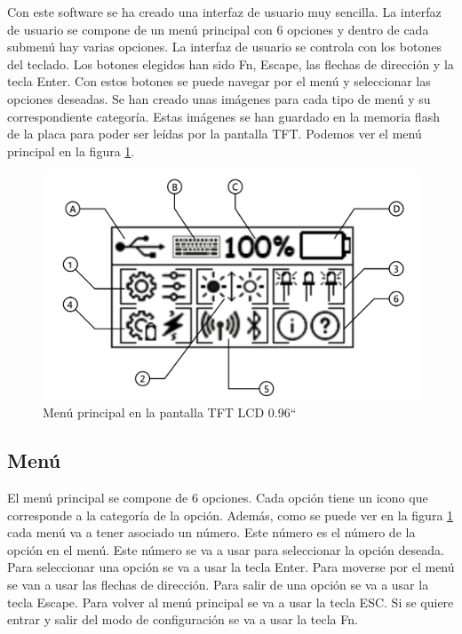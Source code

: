 Con este software se ha creado una interfaz de usuario muy sencilla. La interfaz de usuario se compone de un menú principal con 6 opciones y dentro de cada submenú hay varias opciones. La interfaz de usuario se controla con los botones del teclado. Los botones elegidos han sido Fn, Escape, las flechas de dirección y la tecla Enter. Con estos botones se puede navegar por el menú y seleccionar las opciones deseadas. Se han creado unas imágenes para cada tipo de menú y su correspondiente categoría. Estas imágenes se han guardado en la memoria flash de la placa para poder ser leídas por la pantalla \gls{TFT}. Podemos ver el menú principal en la figura \ref{fig:MenuPrincipal}.

\begin{figure}[H]
\centering
\includegraphics[width=1\textwidth]{imagenes/Capitulos/Cap07/PantallaMenuPrincipal.png}
\caption{Menú principal en la pantalla \gls{TFT} LCD 0.96``}
\label{fig:MenuPrincipal}
\end{figure}

\subsection{Menú}

El menú principal se compone de 6 opciones. Cada opción tiene un icono que corresponde a la categoría de la opción. Además, como se puede ver en la figura \ref{fig:MenuPrincipal} cada menú va a tener asociado un número. Este número es el número de la opción en el menú. Este número se va a usar para seleccionar la opción deseada. Para seleccionar una opción se va a usar la tecla Enter. Para moverse por el menú se van a usar las flechas de dirección. Para salir de una opción se va a usar la tecla Escape. Para volver al menú principal se va a usar la tecla ESC. Si se quiere entrar y salir del modo de configuración se va a usar la tecla Fn.

